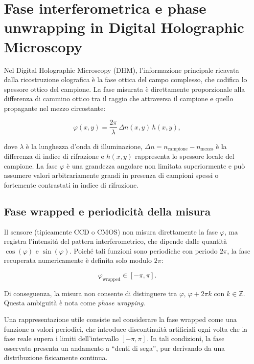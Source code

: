 \pagecolor{white}
{\color{green!30!black}
\section{Fase interferometrica e phase unwrapping in Digital Holographic Microscopy}

Nel Digital Holographic Microscopy (DHM), l’informazione principale ricavata dalla ricostruzione olografica è la fase ottica del campo complesso, che codifica lo spessore ottico del campione. La fase misurata è direttamente proporzionale alla differenza di cammino ottico tra il raggio che attraversa il campione e quello propagante nel mezzo circostante:

\begin{equation}
\varphi(x,y) = \frac{2\pi}{\lambda}\,\Delta n(x,y)\,h(x,y),
\end{equation}

dove $\lambda$ è la lunghezza d’onda di illuminazione, $\Delta n = n_{\text{campione}} - n_{\text{mezzo}}$ è la differenza di indice di rifrazione e $h(x,y)$ rappresenta lo spessore locale del campione. La fase $\varphi$ è una grandezza angolare non limitata superiormente e può assumere valori arbitrariamente grandi in presenza di campioni spessi o fortemente contrastati in indice di rifrazione.

\subsection{Fase wrapped e periodicità della misura}

Il sensore (tipicamente CCD o CMOS) non misura direttamente la fase $\varphi$, ma registra l’intensità del pattern interferometrico, che dipende dalle quantità $\cos(\varphi)$ e $\sin(\varphi)$. Poiché tali funzioni sono periodiche con periodo $2\pi$, la fase recuperata numericamente è definita solo modulo $2\pi$:

\begin{equation}
\varphi_{\text{wrapped}} \in [-\pi, \pi].
\end{equation}

Di conseguenza, la misura non consente di distinguere tra $\varphi$, $\varphi + 2\pi k$ con $k \in \mathbb{Z}$. Questa ambiguità è nota come \textit{phase wrapping}.

Una rappresentazione utile consiste nel considerare la fase wrapped come una funzione a valori periodici, che introduce discontinuità artificiali ogni volta che la fase reale supera i limiti dell’intervallo $[-\pi,\pi]$. In tali condizioni, la fase osservata presenta un andamento a “denti di sega”, pur derivando da una distribuzione fisicamente continua.

}
